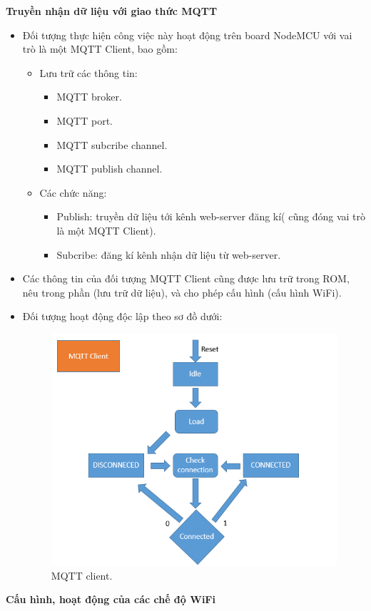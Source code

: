 \documentclass[a4paper,12pt,oneside]{article}
\begin{document}
\noindent \textbf{Truyền nhận dữ liệu với giao thức MQTT}
	\begin{itemize}
	\item Đối tượng thực hiện công việc này hoạt động trên board NodeMCU với vai trò là một MQTT Client, bao gồm:
		\begin{itemize}
		\item Lưu trữ các thông tin:
			\begin{itemize}
			\item	MQTT broker.
			\item	MQTT port.
			\item	MQTT subcribe channel.
			\item	MQTT publish channel.
			\end{itemize}
		\item	Các chức năng:
			\begin{itemize}
				\item Publish: truyền dữ liệu tới kênh web-server đăng kí( cũng đóng vai trò là một MQTT Client).
				\item	Subcribe: đăng kí kênh nhận dữ liệu từ web-server.
			\end{itemize}

		\end{itemize}
		\item Các thông tin của đối tượng MQTT Client cũng được lưu trữ trong ROM, nêu trong phần (lưu trữ dữ liệu), và cho phép cấu hình (cấu hình WiFi).
		\item Đối tượng hoạt động độc lập theo sơ đồ dưới:
		
			\begin{figure}[H]
				\centering
				\includegraphics[scale=.6]{hinh/mqtt_client.PNG}		
				\caption{MQTT client.}
			\end{figure}
			
	\end{itemize}
\noindent	\textbf{Cấu hình, hoạt động của các chế độ WiFi}
\end{document}
